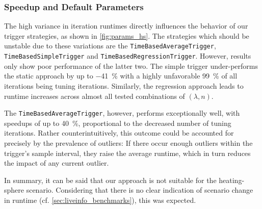 

\subsubsection{Speedup and Default Parameters}
The high variance in iteration runtimes directly influences the behavior of our trigger strategies, as shown in \autoref{fig:params_hs}. The strategies which should be unstable due to these variations are the \texttt{TimeBasedAverageTrigger}, \texttt{TimeBasedSimpleTrigger} and \texttt{TimeBasedRegressionTrigger}. However, results only show poor performance of the latter two. The simple trigger under-performs the static approach by up to \qty{-41}{\percent} with a highly unfavorable \qty{99}{\percent} of all iterations being tuning iterations. Similarly, the regression approach leads to runtime increases across almost all tested combinations of $(\lambda, n)$.

The \texttt{TimeBasedAverageTrigger}, however, performs exceptionally well, with speedups of up to \qty{40}{\percent}, proportional to the decreased number of tuning iterations. Rather counterintuitively, this outcome could be accounted for precisely by the prevalence of outliers: If there occur enough outliers within the trigger's sample interval, they raise the average runtime, which in turn reduces the impact of any current outlier.

In summary, it can be said that our approach is not suitable for the heating-sphere scenario. Considering that there is no clear indication of scenario change in runtime (cf. \autoref{sec:liveinfo_benchmarks}), this was expected.



